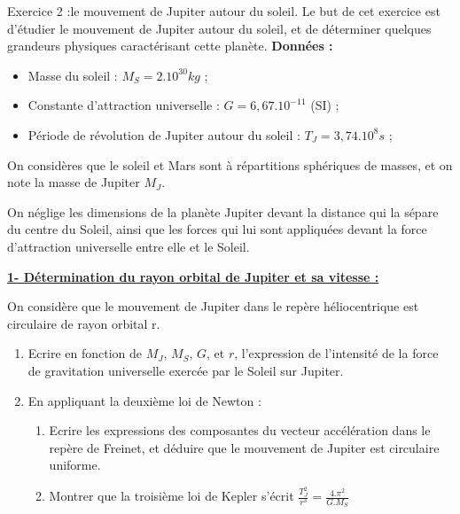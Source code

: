 \documentclass[12pt, french]{article}
\begin{document}
\begin{Box2}{Exercice 2 :le mouvement de Jupiter autour du soleil. }
Le but de cet exercice est d’étudier le mouvement de Jupiter autour du soleil, et de
déterminer quelques grandeurs physiques caractérisant cette planète.
\textbf{Données : }
\begin{itemize}

	\item Masse du soleil : $M_S = 2.10^{30} kg$ ;
	\item Constante d’attraction universelle : $G = 6,67.10^{-11}$ (SI) ;
	\item Période de révolution de Jupiter autour du soleil : $T_J = 3,74.10^8 s$ ;
\end{itemize}
On considères que le soleil et Mars sont à répartitions sphériques de masses, et on
note la masse de Jupiter $M_J$.

On néglige les dimensions de la planète Jupiter devant la distance qui la sépare du
centre du Soleil, ainsi que les forces qui lui sont appliquées devant la force
d’attraction universelle entre elle et le Soleil.

\textbf{\underline{1- Détermination du rayon orbital de Jupiter et sa vitesse : }}

On considère que le mouvement de Jupiter dans le repère héliocentrique est circulaire
de rayon orbital r.

\begin{enumerate}

	\item Ecrire en fonction de $M_J$, $M_S$, $G$, et $r$, l’expression de l’intensité de la force
de gravitation universelle exercée par le Soleil sur Jupiter.
	\item En appliquant la deuxième loi de Newton :
		\begin{enumerate}

			\item Ecrire les expressions des composantes du vecteur accélération dans le
repère de Freinet, et déduire que le mouvement de Jupiter est
circulaire uniforme. 
\item Montrer que la troisième loi de Kepler s’écrit $\frac{T_J^2}{r^3} = \frac{4.\pi^2}{G.M_S}$


\end{enumerate}
\end{enumerate}
\end{Box2}
\end{document}
